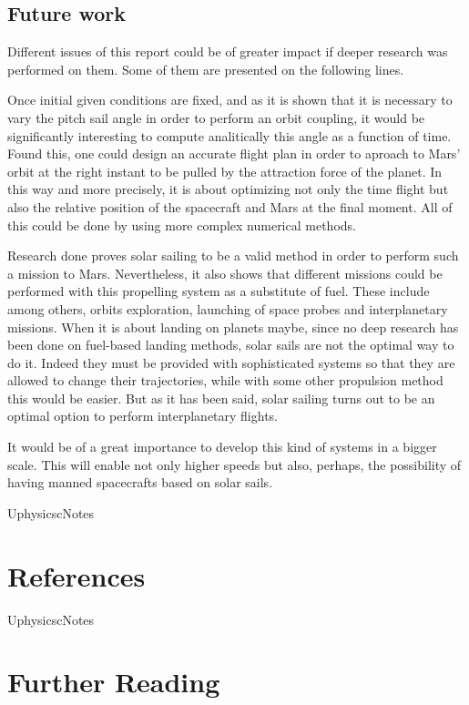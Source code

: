 \documentclass[twocolumn,12pt,a4paper]{article}
\numberwithin{equation}{section}
\begin{document}
\subsection{Future work}
Different issues of this report could be of greater impact if deeper research was performed on them. Some of them are presented on the following lines.

Once initial given conditions are fixed, and as it is shown that it is necessary to vary the pitch sail angle in order to perform an orbit coupling, it would be significantly interesting to compute analitically this angle as a function of time. Found this, one could design an accurate flight plan in order to aproach to Mars' orbit at the right instant to be pulled by the attraction force of the planet. In this way and more precisely, it is about optimizing not only the time flight but also the relative position of the spacecraft and Mars at the final moment. All of this could be done by using more complex numerical methods.

Research done proves solar sailing to be a valid method in order to perform such a mission to Mars. Nevertheless, it also shows that different missions could be performed with this propelling system as a substitute of fuel. These include among others, orbits exploration, launching of space probes and interplanetary missions. When it is about landing on planets maybe, since no deep research has been done on fuel-based landing methods, solar sails are not the optimal way to do it. Indeed they must be provided with sophisticated systems so that they are allowed to change their trajectories, while with some other propulsion method this would be easier. But as it has been said, solar sailing turns out to be an optimal option to perform interplanetary flights.

It would be of a great importance to develop this kind of systems in a bigger scale. This will enable not only higher speeds but also, perhaps, the possibility of having manned spacecrafts based on solar sails.
\clearpage

\begin{btSect}{UphysicscNotes}
	
	\section*{References}	
	\btPrintCited
\end{btSect}

\begin{btSect}{UphysicscNotes}
	
	\section*{Further Reading}	
	\btPrintNotCited
\end{btSect}
\end{document}
